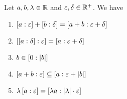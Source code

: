 \begin{theorem}
  Let $a,b,\lambda\in\R$ and $\epsilon,\delta\in\Rplus$. We have

  \begin{enumerate}
    \item $\an[\epsilon]{a}+\an[\delta]{b}=\an[\epsilon+\delta]{a+b}$
    \item $\an[\epsilon]{\an[\delta]{a}} = \an[\epsilon+\delta]{a}$
    \item $b \in \an[|b|]{0}$
    \item $\an[\epsilon]{a+b} \subseteq \an[\epsilon+\abs{b}]{a}$
    \item $\lambda \an[\epsilon]{a} = \an[\abs{\lambda}\cdot \epsilon]{\lambda a}$
  \end{enumerate}
\end{theorem}
